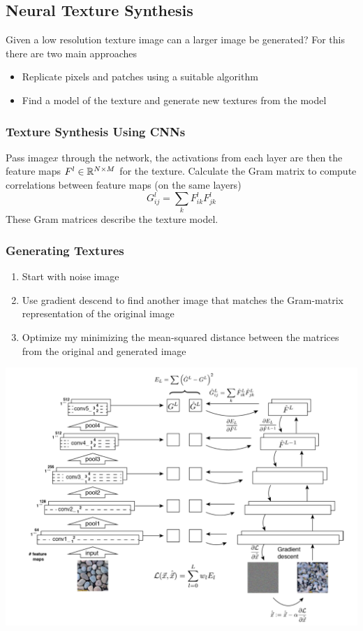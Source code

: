 \subsection{Neural Texture Synthesis}
Given a low resolution texture image can a larger image be generated? For this there are two main approaches
\begin{itemize}[label=-]
	\item Replicate pixels and patches using a suitable algorithm
	\item Find a model of the texture and generate new textures from the model
\end{itemize}

\subsubsection{Texture Synthesis Using CNNs}
Pass image$x$ through the network, the activations from each layer are then the feature maps $F^l \in \mathbb{R}^{N\times M}$ for the texture.
Calculate the Gram matrix to compute correlations between feature maps (on the same layers)
\begin{equation*}
	G_{ij}^l = \sum_{k} F_{ik}^l F_{jk}^l
\end{equation*}
These Gram matrices describe the texture model.

\subsubsection{Generating Textures}
\begin{enumerate}[itemsep=0em]
	\item Start with noise image
	\item Use gradient descend to find another image that matches the Gram-matrix representation of the original image
	\item Optimize my minimizing the mean-squared distance between the matrices from the original and generated image
\end{enumerate}

\begin{center}
	\includegraphics[width=0.8\linewidth]{img/conditional_GAN_texture_generation}
\end{center}

